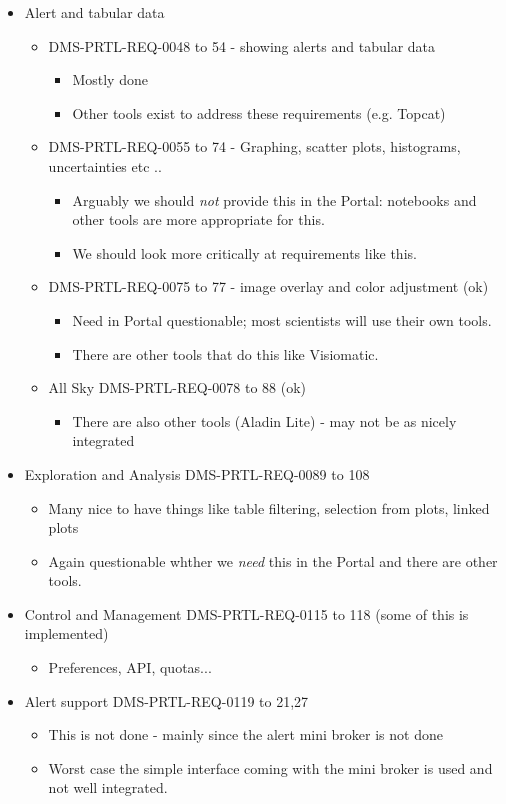 \begin{itemize}
\item Alert and tabular data
\begin{itemize}
\item DMS-PRTL-REQ-0048 to 54 - showing alerts and tabular data
\begin{itemize}
\item Mostly done
\item Other tools exist to address these requirements (e.g. Topcat)
\end{itemize}
\item DMS-PRTL-REQ-0055 to 74 - Graphing, scatter plots, histograms, uncertainties etc ..
\begin{itemize}
\item Arguably we should \emph{not} provide this in the Portal: notebooks and other tools are more appropriate for this.
\item We should look more critically at requirements like this.
\end{itemize}
\item DMS-PRTL-REQ-0075 to 77 - image overlay and color adjustment (ok)
\begin{itemize}
\item Need in Portal questionable; most scientists will use their own tools.
\item There are other tools that do this like Visiomatic.
\end{itemize}


\item All Sky  DMS-PRTL-REQ-0078 to 88 (ok)
\begin{itemize}
\item There are also other tools (Aladin Lite) - may not be as nicely integrated
\end{itemize}

\end{itemize}

\item Exploration and Analysis DMS-PRTL-REQ-0089 to 108
\begin{itemize}
\item Many nice to have things like table filtering, selection from plots, linked plots
\item Again questionable whther we \emph{need} this in the Portal and there are other tools.
\end{itemize}

\item Control and Management DMS-PRTL-REQ-0115 to 118 (some of this is implemented)
\begin{itemize}
\item Preferences, API, quotas...
\end{itemize}
\item Alert support DMS-PRTL-REQ-0119 to 21,27
\begin{itemize}
\item This is not done - mainly since the alert mini broker is not done
\item Worst case the simple interface coming with the mini broker is used and not well integrated.
\end{itemize}


\end{itemize}
